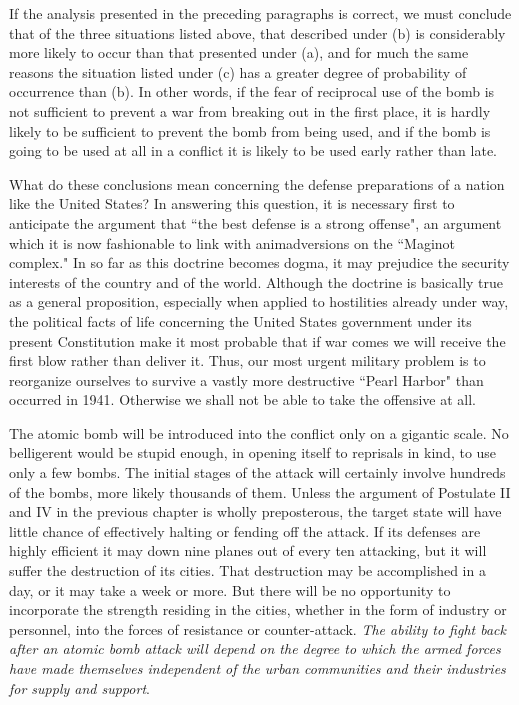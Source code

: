 If the analysis presented in the preceding paragraphs is correct, we must conclude that of the three situations listed above, that described under (b) is considerably more likely to occur than that presented under (a), and for much the same reasons the situation listed under (c) has a greater degree of probability of occurrence than (b). In other words, if the fear of reciprocal use of the bomb is not sufficient to prevent a war from breaking out in the first place, it is hardly likely to be sufficient to prevent the bomb from being used, and if the bomb is going to be used at all in a conflict it is likely to be used early rather than late.

What do these conclusions mean concerning the defense preparations of a nation like the United States? In answering this question, it is necessary first to anticipate the argument that ``the best defense is a strong offense", an argument which it is now fashionable to link with animadversions on the ``Maginot complex." In so far as this doctrine becomes dogma, it may prejudice the security interests of the country and of the world. Although the doctrine is basically true as a general proposition, especially when applied to hostilities already under way, the political facts of life concerning the United States government under its present Constitution make it most probable that if war comes we will receive the first blow rather than deliver it. Thus, our most urgent military problem is to reorganize ourselves to survive a vastly more destructive ``Pearl Harbor" than occurred in 1941. Otherwise we shall not be able to take the offensive at all.

\pageref{II-Retaliation3}

The atomic bomb will be introduced into the conflict only on a gigantic scale. No belligerent would be stupid enough, in opening itself to reprisals in kind, to use only a few bombs. The initial stages of the attack will certainly involve hundreds of the bombs, more likely thousands of them. Unless the argument of Postulate II and IV in the previous chapter is wholly preposterous, the target state will have little chance of effectively halting or fending off the attack. If its defenses are highly efficient it may down nine planes out of every ten attacking, but it will suffer the destruction of its cities. That destruction may be accomplished in a day, or it may take a week or more. But there will be no opportunity to incorporate the strength residing in the cities, whether in the form of industry or personnel, into the forces of resistance or counter-attack. \emph{The ability to fight back after an atomic bomb attack will depend on the degree to which the armed forces have made themselves independent of the urban communities and their industries for supply and support}.

